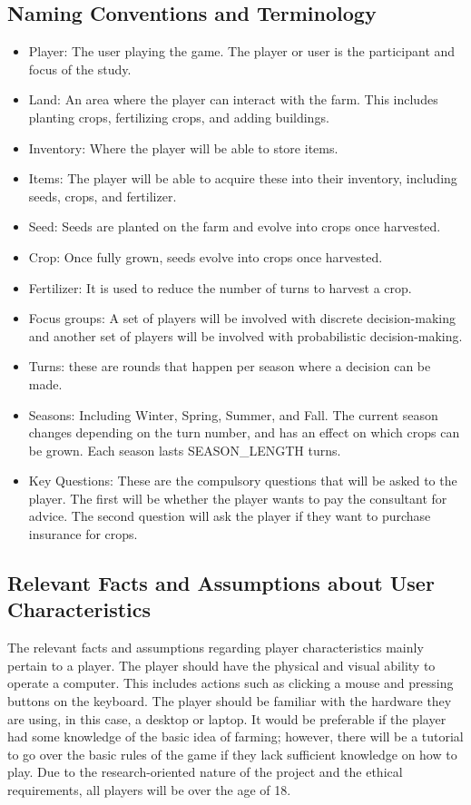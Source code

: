 \documentclass{article}
\begin{document}
\subsection{Naming Conventions and Terminology}
\begin{itemize}
    \item Player: The user playing the game. The player or user is the participant and focus of the study.
    \item Land: An area where the player can interact with the farm. This includes planting crops, fertilizing crops, and adding buildings.
    \item Inventory: Where the player will be able to store items.
    \item Items: The player will be able to acquire these into their inventory, including seeds, crops, and fertilizer.
    \item Seed: Seeds are planted on the farm and evolve into crops once harvested.
    \item Crop: Once fully grown, seeds evolve into crops once harvested.
    \item Fertilizer: It is used to reduce the number of turns to harvest a crop.
    \item Focus groups: A set of players will be involved with discrete decision-making and another set of players will be involved with probabilistic decision-making.
    \item Turns: these are rounds that happen per season where a decision can be made. 
    \item Seasons: Including Winter, Spring, Summer, and Fall. The current season changes depending on the turn number, and has an effect on which crops can be grown. Each season lasts SEASON\_LENGTH turns.
    \item Key Questions: These are the compulsory questions that will be asked to the player. The first will be whether the player wants to pay the consultant for advice. The second question will ask the player if they want to purchase insurance for crops.
\end{itemize}
\subsection{Relevant Facts and Assumptions about User Characteristics}

The relevant facts and assumptions regarding player characteristics mainly pertain to a player. The player should have the physical and visual ability to operate a computer. This includes actions such as clicking a mouse and pressing buttons on the keyboard. The player should be familiar with the hardware they are using, in this case, a desktop or laptop. It would be preferable if the player had some knowledge of the basic idea of farming; however, there will be a tutorial to go over the basic rules of the game if they lack sufficient knowledge on how to play. Due to the research-oriented nature of the project and the ethical requirements, all players will be over the age of 18.
\end{document}
